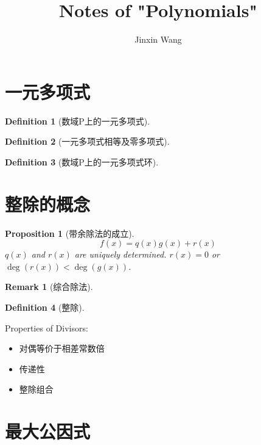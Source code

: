 \documentclass[onecolumn]{ctexart}
\title{Notes of "Polynomials"}
\author{Jinxin Wang}
\date{}
\newtheorem{definition}{Definition}
\newtheorem{proposition}{Proposition}
\newtheorem{remark}{Remark}
\begin{document}
\maketitle

\section{一元多项式}

\begin{definition}[数域P上的一元多项式]
  
\end{definition}

\begin{definition}[一元多项式相等及零多项式]
  
\end{definition}

\begin{definition}[数域P上的一元多项式环]
  
\end{definition}

\section{整除的概念}

\begin{proposition}[带余除法的成立]
  \begin{equation}
    f(x) = q(x)g(x) + r(x)
  \end{equation}
  $q(x)$ and $r(x)$ are uniquely determined. $r(x ) = 0$ or $\deg(r(x)) < \deg(g(x))$.
\end{proposition}
\begin{remark}[综合除法]
  
\end{remark}


\begin{definition}[整除]
  
\end{definition}

Properties of Divisors:
\begin{itemize}
  \item 对偶等价于相差常数倍
  \item 传递性
  \item 整除组合
\end{itemize}

\section{最大公因式}
\end{document}

